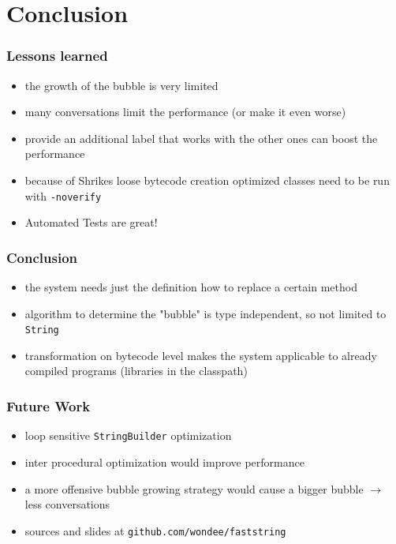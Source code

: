\documentclass{beamer}
\begin{document}
\section{Conclusion}

\frame{\sectionpage}

\begin{frame}
	\frametitle{Lessons learned}
   \begin{itemize}
      \item the growth of the bubble is very limited
      \item many conversations limit the performance (or make it even worse)  
      \item provide an additional label that works with the other ones can boost the performance
      \item because of Shrikes loose bytecode creation optimized classes need to be run with \texttt{-noverify}
      \item Automated Tests are great!
   \end{itemize}
\end{frame}

\begin{frame}
	\frametitle{Conclusion}
	\begin{itemize}
      \item the system needs just the definition how to replace a certain method
		\item algorithm to determine the "bubble" is type independent, so not limited to \texttt{String}
		\item transformation on bytecode level makes the system applicable to already compiled programs (libraries in the classpath) 
	\end{itemize}
\end{frame}

\begin{frame}
	\frametitle{Future Work}
  \begin{itemize}
    \item loop sensitive \texttt{StringBuilder} optimization 
    \item inter procedural optimization would improve performance 
    \item a more offensive bubble growing strategy would cause a bigger bubble $\rightarrow$ less conversations
    \item sources and slides at \texttt{github.com/wondee/faststring}
  \end{itemize}
\end{frame}
\end{document}
